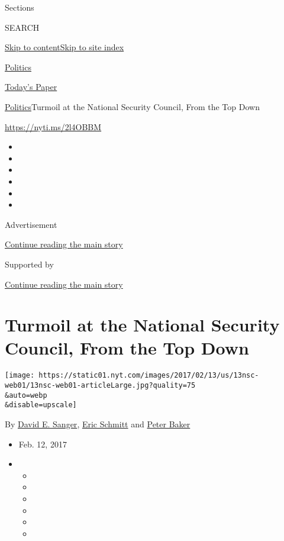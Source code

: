 Sections

SEARCH

\protect\hyperlink{site-content}{Skip to
content}\protect\hyperlink{site-index}{Skip to site index}

\href{https://www.nytimes.com/section/politics}{Politics}

\href{https://myaccount.nytimes.com/auth/login?response_type=cookie\&client_id=vi}{}

\href{https://www.nytimes.com/section/todayspaper}{Today's Paper}

\href{/section/politics}{Politics}\textbar{}Turmoil at the National
Security Council, From the Top Down

\url{https://nyti.ms/2l4OBBM}

\begin{itemize}
\item
\item
\item
\item
\item
\item
\end{itemize}

Advertisement

\protect\hyperlink{after-top}{Continue reading the main story}

Supported by

\protect\hyperlink{after-sponsor}{Continue reading the main story}

\hypertarget{turmoil-at-the-national-security-council-from-the-top-down}{%
\section{Turmoil at the National Security Council, From the Top
Down}\label{turmoil-at-the-national-security-council-from-the-top-down}}

\texttt{[image: https://static01.nyt.com/images/2017/02/13/us/13nsc-web01/13nsc-web01-articleLarge.jpg?quality=75\\\&auto=webp\\\&disable=upscale]}

By \href{http://www.nytimes.com/by/david-e-sanger}{David E. Sanger},
\href{http://www.nytimes.com/by/eric-schmitt}{Eric Schmitt} and
\href{http://www.nytimes.com/by/peter-baker}{Peter Baker}

\begin{itemize}
\item
  Feb. 12, 2017
\item
  \begin{itemize}
  \item
  \item
  \item
  \item
  \item
  \item
  \end{itemize}
\end{itemize}

